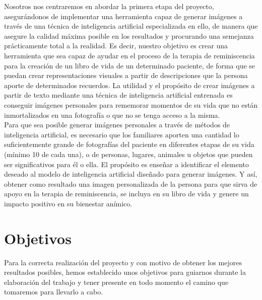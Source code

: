 Nosotros nos centraremos en abordar la primera etapa del proyecto, asegurándonos de implementar una herramienta capaz de generar imágenes a través de una técnica de inteligencia artificial especializada en ello, de manera que asegure la calidad máxima posible en los resultados y procurando una semejanza prácticamente total a la realidad. Es decir, nuestro objetivo es crear una herramienta que sea capaz de ayudar en el proceso de la terapia de reminiscencia para la creación de un libro de vida de un determinado paciente, de forma que se puedan crear representaciones visuales a partir de descripciones que la persona aporte de determinados recuerdos. La utilidad y el propósito de crear imágenes a partir de texto mediante una técnica de inteligencia artificial entrenada es conseguir imágenes personales para rememorar momentos de su vida que no están inmortalizados en una fotografía o que no se tenga acceso a la misma. \\

Para que sea posible generar imágenes personales a través de métodos de inteligencia artificial, es necesario que los familiares aporten una  cantidad lo suficientemente grande de fotografías del paciente en diferentes etapas de su vida (mínimo 10 de cada una), o de personas, lugares, animales u objetos que pueden ser significativos para él o ella. El propósito es enseñar a identificar el elemento deseado al modelo de inteligencia artificial diseñado para generar imágenes. Y así, obtener como resultado una imagen personalizada de la persona para que sirva de apoyo en la terapia de reminiscencia, se incluya en su libro de vida y genere un impacto positivo en su bienestar anímico.\\


\section{Objetivos}

Para la correcta realización del proyecto y con motivo de obtener los mejores resultados posibles, hemos establecido unos objetivos para guiarnos durante la elaboración del trabajo y tener presente en todo momento el camino que tomaremos para llevarlo a cabo. 

